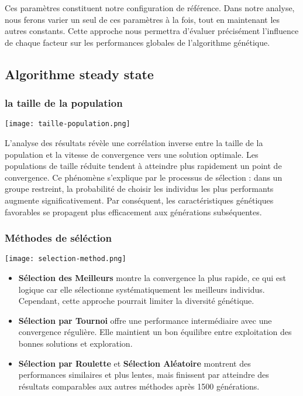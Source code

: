 \documentclass{article}
\begin{document}
Ces paramètres constituent notre configuration de référence. Dans notre analyse, nous ferons varier un seul de ces paramètres à la fois, tout en maintenant les autres constants. Cette approche nous permettra d'évaluer précisément l'influence de chaque facteur sur les performances globales de l'algorithme génétique.

\subsection{Algorithme steady state}
\subsubsection{la taille de la population}

\texttt{[image: taille-population.png]}

 L'analyse des résultats révèle une corrélation inverse entre la taille de la population et la vitesse de convergence vers une solution optimale. Les populations de taille réduite tendent à atteindre plus rapidement un point de convergence. Ce phénomène s'explique par le processus de sélection : dans un groupe restreint, la probabilité de choisir les individus les plus performants augmente significativement. Par conséquent, les caractéristiques génétiques favorables se propagent plus efficacement aux générations subséquentes.

\subsubsection{Méthodes de séléction}
\texttt{[image: selection-method.png]}

\begin{itemize}
    \item \textbf{Sélection des Meilleurs} montre la convergence la plus rapide, ce qui est logique car elle sélectionne systématiquement les meilleurs individus. Cependant, cette approche pourrait limiter la diversité génétique.

    \item \textbf{Sélection par Tournoi} offre une performance intermédiaire avec une convergence régulière. Elle maintient un bon équilibre entre exploitation des bonnes solutions et exploration.

    \item \textbf{Sélection par Roulette} et \textbf{Sélection Aléatoire} montrent des performances similaires et plus lentes, mais finissent par atteindre des résultats comparables aux autres méthodes après 1500 générations.
\end{itemize}
\end{document}
